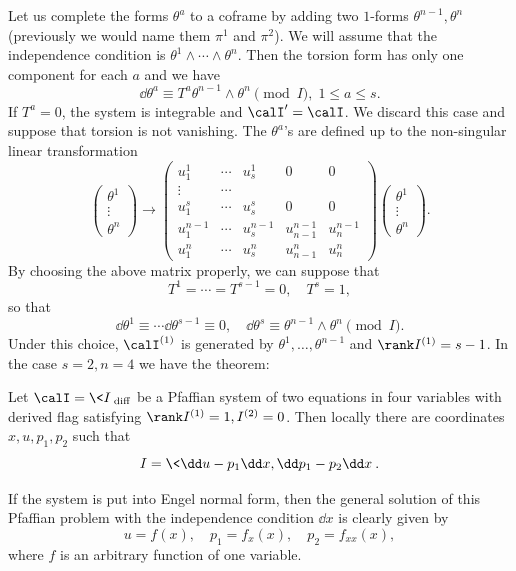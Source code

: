 Let us complete the forms $\theta^a$ to a coframe by adding two $1$-forms $\theta^{n-1},\theta^{n}$ (previously we would name them $\pi^1$ and $\pi^2$). We will assume that the independence condition is $\theta^1\wedge\cdots\wedge\theta^n$. Then the torsion form has only one component for each $a$ and we have 
\[\dd\theta^a\equiv T^a \theta^{n-1}\wedge\theta^n \pmod{I}, \; 1\leq a\leq s.\]
If $T^a=0$, the system is integrable and $\calI'=\calI$. We discard this case and suppose that torsion is not vanishing. The $\theta^a$'s are defined up to the non-singular linear transformation 
\[
\begin{pmatrix}
    \theta^1 \\
    \vdots \\
    \theta^n
\end{pmatrix}\to 
\begin{pmatrix}
    u^1_1 & \cdots & u^1_s & 0 & 0\\
    \vdots & \cdots & & &\\
    u^s_1 & \cdots & u^s_s & 0 & 0\\
    u^{n-1}_1 & \cdots & u^{n-1}_s & u^{n-1}_{n-1}& u^{n-1}_n\\
    u^n_1 & \cdots & u^n_s & u^n_{n-1} & u^n_n
\end{pmatrix}
\begin{pmatrix}
    \theta^1 \\
    \vdots \\
    \theta^n
\end{pmatrix}.
\]
By choosing the above matrix properly, we can suppose that 
\[T^1=\cdots =T^{s-1}=0,\quad T^s=1,\]
so that 
\[\dd \theta^1\equiv \cdots \dd\theta^{s-1}\equiv 0,\quad \dd\theta^s\equiv \theta^{n-1}\wedge\theta^n \pmod{I}.\label{eq 31 Bryant}\]
Under this choice, $\calI^{(1)}$ is generated by $\theta^1,\ldots,\theta^{n-1}$ and $\rank I^{(1)}=s-1$. In the case $s=2,n=4$ we have the theorem:

\begin{thm}\label{thm 5.1 Bryant}
    Let $\calI=\<I\>_{\mathrm{diff}}$ be a Pfaffian system of two equations in four variables with derived flag satisfying $\rank I^{(1)}=1, I^{{(2)}}=0$. Then locally there are coordinates $x,u,p_1,p_2$ such that 
    \[I=\<\dd u-p_1\dd x,\dd p_1-p_2\dd x\>.\]
\end{thm}

If the system is put into Engel normal form, then the general solution of this Pfaffian problem with the independence condition $\dd x$ is clearly given by 
\[u=f(x),\quad p_1=f_x(x),\quad p_2=f_{xx}(x),\]
where $f$ is an arbitrary function of one variable.

